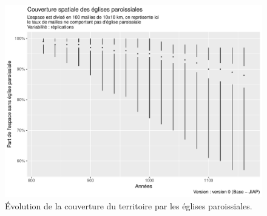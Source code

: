 \begin{figure}[H]
\captionsetup{width=\linewidth}
\includegraphics[width=0.9\linewidth]{img/resultats/v0_paroisses_occupation.pdf}
\caption{Évolution de la couverture du territoire par les églises paroissiales.\\
}
\label{fig:couverture-paroisses-v0}
\end{figure}

\printbibliography[title={Références}]
